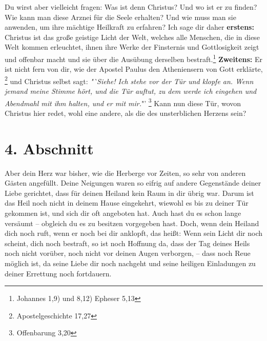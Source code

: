 Du wirst aber vielleicht fragen: Was ist denn Christus? Und wo ist er zu finden?
Wie kann man diese Arznei für die Seele erhalten? Und wie muss man sie anwenden,
um ihre mächtige Heilkraft zu erfahren? Ich sage dir daher \textbf{erstens:}
Christus ist das große geistige Licht der Welt, welches alle Menschen, die in
diese Welt kommen erleuchtet, ihnen ihre Werke der Finsternis und Gottlosigkeit
zeigt und offenbar macht und sie über die Ausübung derselben
bestraft.\footnote{Johannes 1,9) und 8,12) Epheser 5,13}
\textbf{Zweitens:} Er ist nicht fern von dir, wie der
Apostel Paulus den Atheniensern von Gott erklärte,
\footnote{Apostelgeschichte 17,27}
und Christus selbst sagt:
\textit{"`Siehe! Ich stehe vor der Tür und klopfe an.
Wenn jemand meine Stimme hört, und die Tür auftut, zu dem werde ich eingehen
und Abendmahl mit ihm halten, und er mit mir.}"'
\footnote{Offenbarung 3,20}
Kann 
nun diese Tür, wovon Christus hier redet, wohl eine andere, als die des
unsterblichen Herzens sein?

\section{4. Abschnitt}  \label{kap2_ab4}

Aber dein Herz war bisher, wie die Herberge vor Zeiten, so sehr von anderen
Gästen angefüllt. Deine Neigungen waren so eifrig auf andere Gegenstände deiner
Liebe gerichtet, dass für deinen Heiland kein Raum in dir übrig war. Darum ist
das Heil noch nicht in deinem Hause eingekehrt, wiewohl es bis zu deiner Tür
gekommen ist, und sich dir oft angeboten hat. Auch hast du es schon lange
versäumt -- obgleich du es zu besitzen vorgegeben hast. Doch, wenn dein Heiland
dich noch ruft, wenn er noch bei dir anklopft, das heißt: Wenn sein Licht dir
noch scheint, dich noch bestraft, so ist noch Hoffnung da, dass der Tag deines
Heils noch nicht vorüber, noch nicht vor deinen Augen verborgen, -- dass noch
Reue
möglich ist, da seine Liebe dir noch nachgeht und seine heiligen Einladungen
zu deiner Errettung noch fortdauern.

